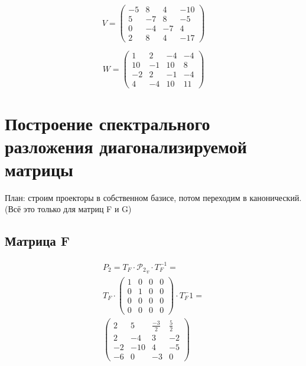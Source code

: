 \documentclass[12pt, a4paper]{article}
\begin{document}
\begin{statement}
        \begin{equation}
            V = \left(\begin{matrix}
                -5 & 8 & 4 & -10 \\
                5 & -7 & 8 & -5 \\
                0 & -4 & -7 & 4 \\
                2 & 8 & 4 & -17
            \end{matrix}\right)
        \end{equation}

        
        \begin{equation}
            W = \left(\begin{matrix}
                1 & 2 & -4 & -4 \\
                10 & -1 & 10 & 8 \\
                -2 & 2 & -1 & -4 \\
                4 & -4 & 10 & 11
            \end{matrix}\right)
        \end{equation}
    \end{statement}


    \section{Построение спектрального разложения диагонализируемой матрицы}

    План: строим проекторы в собственном базисе, потом переходим в канонический.
    (Всё это только для матриц F и G)

    \subsection{Матрица F}

    \begin{multline}
        P_2 = T_F \cdot {\mathcal{P}_2}_v \cdot T_F^{-1} = \\
        T_F \cdot \left(\begin{matrix}
            1 & 0 & 0 & 0 \\
            0 & 1 & 0 & 0 \\
            0 & 0 & 0 & 0 \\
            0 & 0 & 0 & 0
        \end{matrix}\right) \cdot T_F^-1 = \\
        \left(\begin{matrix}
            2 & 5 & \frac{-3}{2} & \frac{5}{2} \\
            2 & -4 & 3 & -2 \\
            -2 & -10 & 4 & -5 \\
            -6 & 0 & -3 & 0
        \end{matrix}\right)
    \end{multline}
\end{document}
